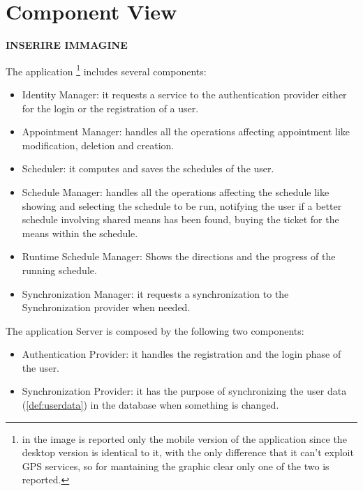 \section{Component View}

\textbf{INSERIRE IMMAGINE}

The application \footnote{in the image is reported only the mobile version of the application since the desktop version is identical to it, with the only difference that it can't exploit GPS services, so for mantaining the graphic clear only one of the two is reported.}
includes several components: 
\begin{itemize}

\item Identity Manager: it requests a service to the authentication provider either for the login or the registration of a user. 

\item Appointment Manager: handles all the operations affecting appointment like modification, deletion and creation.
 
\item Scheduler: it computes and saves the schedules of the user.

\item Schedule Manager: handles all the operations affecting the schedule like showing and selecting the schedule to be run, notifying the user if a better schedule involving shared means has been found, buying the ticket for the means within the schedule. 

\item Runtime Schedule Manager: Shows the directions and the progress of the running schedule.

\item Synchronization Manager: it requests a synchronization to the Synchronization provider when needed.  

\end{itemize}

The application Server is composed by the following two components:
\begin{itemize}

\item Authentication Provider: it handles the registration and the login phase of the user. 

\item Synchronization Provider: it has the purpose of synchronizing the user data (\ref{def:userdata}) in the database when something is changed.
 
\end{itemize}

